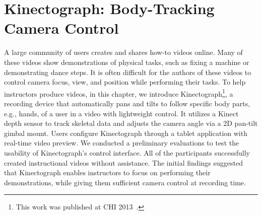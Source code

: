 \chapter{Kinectograph: Body-Tracking Camera Control}
\label{chapter_kinectograph}

A large community of users creates and shares how-to videos online. Many of these videos show demonstrations of physical tasks, such as fixing a machine or demonstrating dance steps. It is often difficult for the authors of these videos to control camera focus, view, and position while performing their tasks.
%
To help instructors produce videos, in this chapter, we introduce Kinectograph\footnote{This work was published at CHI 2013~\cite{Cheng:2013:BCC:2468356.2468568}.}, a recording device that automatically pans and tilts to follow specific body parts, e.g., hands, of a user in a video with lightweight control. It utilizes a Kinect depth sensor to track skeletal data and adjusts the camera angle via a 2D pan-tilt gimbal mount. Users configure Kinectograph through a tablet application with real-time video preview. We conducted a preliminary evaluations to test the usability of Kinectograph's control interface. All of the participants successfully created instructional videos without assistance. The initial findings suggested that Kinectograph enables instructors to focus on performing their demonstrations, while giving them sufficient camera control at recording time.











